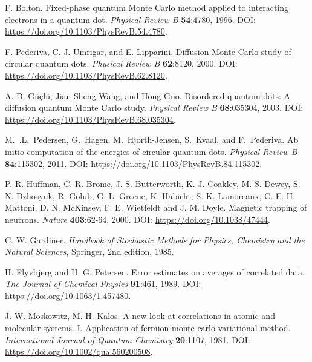 \documentclass[../main.tex]{subfiles}
\begin{document}
\begin{thebibliography}{99}
 F. Bolton. Fixed-phase quantum Monte Carlo method applied to interacting electrons in
a quantum dot. \emph{Physical Review B} \textbf{54}:4780, 1996. DOI: \url{https://doi.org/10.1103/PhysRevB.54.4780}.

 F. Pederiva, C. J. Umrigar, and E. Lipparini. Diffusion Monte Carlo study of
circular quantum dots. \emph{Physical Review B} \textbf{62}:8120, 2000. DOI: \url{https://doi.org/10.1103/PhysRevB.62.8120}.

 A. D. Güçlü, Jian-Sheng Wang, and Hong Guo. Disordered quantum dots: A diffusion
quantum Monte Carlo study. \emph{Physical Review B} \textbf{68}:035304, 2003. DOI: \url{https://doi.org/10.1103/PhysRevB.68.035304}.

 M.~.L.~Pedersen, G.~Hagen, M.~Hjorth-Jensen, S.~Kvaal, and F.~Pederiva. Ab initio computation of the energies of circular quantum dots. \emph{Physical Review B} {\bf 84}:115302, 2011. DOI: \url{https://doi.org/10.1103/PhysRevB.84.115302}.

 P. R. Huffman, C. R. Brome, J. S. Butterworth, K. J. Coakley, M. S. Dewey, S. N. Dzhosyuk, R. Golub, G. L. Greene, K. Habicht, S. K. Lamoreaux, C. E. H. Mattoni, D. N. McKinsey, F. E. Wietfeldt and J. M. Doyle. Magnetic trapping of neutrons. \emph{Nature} \textbf{403}:62-64, 2000. DOI: \url{https://doi.org/10.1038/47444}.

 C. W. Gardiner. \emph{Handbook of Stochastic Methods for Physics, Chemistry and the Natural Sciences}, Springer, 2nd edition, 1985.

 H. Flyvbjerg and H. G. Petersen. Error estimates on averages of correlated data. \emph{The Journal of Chemical Physics} \textbf{91}:461, 1989. DOI: \url{https://doi.org/10.1063/1.457480}.


 J. W. Moskowitz, M. H. Kalos. A new look at correlations in atomic and molecular systems. I. Application of fermion monte carlo variational method. \emph{International Journal of Quantum Chemistry} \textbf{20}:1107, 1981. DOI: \url{https://doi.org/10.1002/qua.560200508}.


\end{thebibliography}
\end{document}
